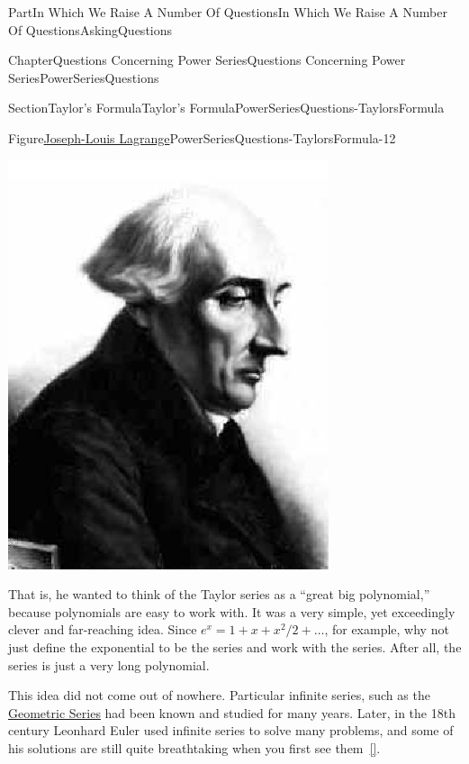 \documentclass[oneside,10pt,]{book}
\newcommand{\xreffont}{\relax}
\numberwithin{equation}{part}
\begin{document}
\begin{partptx}{Part}{In Which We Raise A Number Of Questions}{}{In Which We Raise A Number Of Questions}{}{}{AskingQuestions}
\begin{chapterptx}{Chapter}{Questions Concerning Power Series}{}{Questions Concerning Power Series}{}{}{PowerSeriesQuestions}
\begin{sectionptx}{Section}{Taylor's Formula}{}{Taylor's Formula}{}{}{PowerSeriesQuestions-TaylorsFormula}
\begin{figureptx}{Figure}{\href{https://mathshistory.st-andrews.ac.uk/Biographies/Lagrange/}{Joseph-Louis Lagrange}}{PowerSeriesQuestions-TaylorsFormula-12}{}
\begin{image}{0.325}{0.35}{0.325}{}
\includegraphics[width=\linewidth]{external/images/Lagrange.png}
\end{image}%
\tcblower
\end{figureptx}%
That is, he wanted to think of the Taylor series as a ``great big polynomial,'' because polynomials are easy to work with. It was a very simple, yet exceedingly clever and far-reaching idea. Since \(e^x = 1 +x +x^2/2 +\ldots\), for example, why not just define the exponential to be the series and work with the series. After all, the series is just a very long polynomial.%
\par
This idea did not come out of nowhere. Particular infinite series, such as the \hyperref[EQUATIONGeometricSeries]{Geometric Series} had been known and studied for many years.  Later, in the 18th century Leonhard Euler used infinite series to solve many problems, and some of his solutions are still quite breath\textendash{}taking when you first see them~\hyperlink{sandifer07__early_mathem_leonar_euler}{[{\xreffont 14}]}.%
\par

\end{sectionptx}
\end{chapterptx}
\end{partptx}
\end{document}
